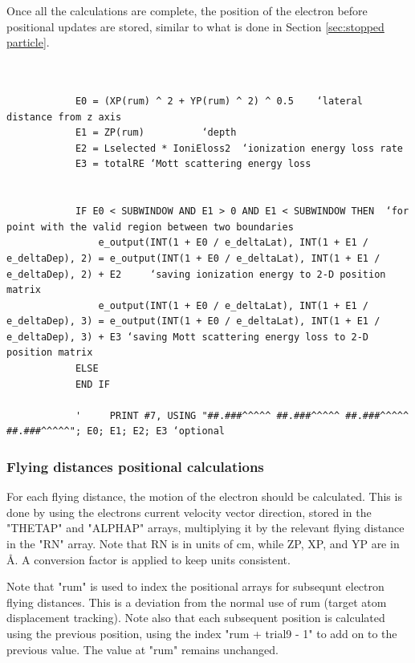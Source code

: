 \documentclass[10pt, reqno]{exam}
\begin{document}
Once all the calculations are complete, the position of the electron before positional updates are stored, similar to what is done in Section \ref{sec:stopped particle}.

\begin{verbatim}
    
    
            E0 = (XP(rum) ^ 2 + YP(rum) ^ 2) ^ 0.5    ‘lateral distance from z axis
            E1 = ZP(rum)          ‘depth                           
            E2 = Lselected * IoniEloss2  ‘ionization energy loss rate
            E3 = totalRE ‘Mott scattering energy loss
    
    
            IF E0 < SUBWINDOW AND E1 > 0 AND E1 < SUBWINDOW THEN  ‘for point with the valid region between two boundaries
                e_output(INT(1 + E0 / e_deltaLat), INT(1 + E1 / e_deltaDep), 2) = e_output(INT(1 + E0 / e_deltaLat), INT(1 + E1 / e_deltaDep), 2) + E2     ‘saving ionization energy to 2-D position matrix
                e_output(INT(1 + E0 / e_deltaLat), INT(1 + E1 / e_deltaDep), 3) = e_output(INT(1 + E0 / e_deltaLat), INT(1 + E1 / e_deltaDep), 3) + E3 ‘saving Mott scattering energy loss to 2-D position matrix
            ELSE
            END IF
    
            '     PRINT #7, USING "##.###^^^^^ ##.###^^^^^ ##.###^^^^^ ##.###^^^^^"; E0; E1; E2; E3 ‘optional
\end{verbatim}

\subsubsection{Flying distances positional calculations}

For each flying distance, the motion of the electron should be calculated. This is done by using the electrons current velocity vector direction, stored in the "THETAP" and "ALPHAP" arrays, multiplying it by the relevant flying distance in the "RN" array. Note that RN is in units of cm, while ZP, XP, and YP are in \si{\angstrom}. A conversion factor is applied to keep units consistent. \par

\vspace{0.5 cm}

Note that "rum" is used to index the positional arrays for subsequnt electron flying distances. This is a deviation from the normal use of rum (target atom displacement tracking). Note also that each subsequent position is calculated using the previous position, using the index "rum + trial9 - 1" to add on to the previous value. The value at "rum" remains unchanged. \par
\end{document}
